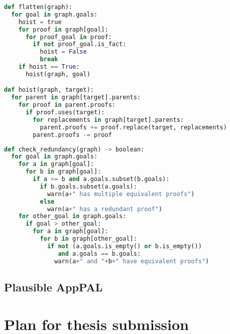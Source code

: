 \documentclass[a4paper]{scrartcl}
\begin{document}
\begin{lstlisting}[language=Python,float,caption={Procedure for flattening the redundancy graph.},label={alg:flatten}]
def flatten(graph):
  for goal in graph.goals:
    hoist = true
    for proof in graph[goal]:
      for proof_goal in proof:
        if not proof_goal.is_fact:
          hoist = False
          break
    if hoist == True:
      hoist(graph, goal)

def hoist(graph, target):
  for parent in graph[target].parents:
    for proof in parent.proofs:
      if proof.uses(target):
        for replacements in graph[target].parents:
          parent.proofs += proof.replace(target, replacements)
        parent.proofs -= proof
\end{lstlisting}

\begin{lstlisting}[language=Python,float,caption={Procedure to check for redundancy.},label={alg:redundancy}]
def check_redundancy(graph) -> boolean:
  for goal in graph.goals:
    for a in graph[goal]:
      for b in graph[goal]:
        if a >= b and a.goals.subset(b.goals):
          if b.goals.subset(a.goals):
            warn(a+" has multiple equivalent proofs") 
          else
            warn(a+" has a redundant proof")
    for other_goal in graph.goals:
      if goal > other_goal:
        for a in graph[goal]:
          for b in graph[other_goal]:
            if not (a.goals.is_empty() or b.is_empty())
               and a.goals == b.goals:
              warn(a+" and "+b+" have equivalent proofs")
\end{lstlisting}

\subsection{Plausible AppPAL}
\label{sec:plausible}

\section{Plan for thesis submission}
\label{sec:thesis}
 
\end{document}
